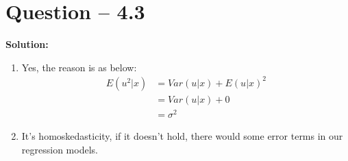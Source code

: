 \documentclass[11pt]{article} %
\begin{document}
\section{Question -- 4.3}
\textbf{Solution:}
\begin{enumerate}
    \item Yes, the reason is as below:
         \begin{align*}
             E(u^2|x)&=Var(u|x)+E(u|x)^2\\
                     &=Var(u|x)+0\\
                     &=\sigma^2
         \end{align*}
    \item It's homoskedasticity, if it doesn't hold, there would some error terms in our regression models.
\end{enumerate}
\end{document}
